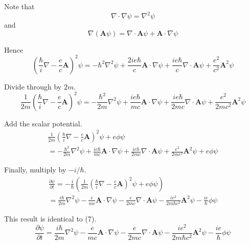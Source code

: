 \documentclass[12pt]{article}
\begin{document}
Note that
\begin{equation*}
\nabla\cdot\nabla\psi=\nabla^2\psi
\end{equation*}
and
\begin{equation*}
\nabla(\mathbf A\psi)=\nabla\cdot\mathbf A\psi+\mathbf A\cdot\nabla\psi
\end{equation*}

Hence
\begin{equation*}
\left(\frac{\hbar}{i}\nabla-\frac{e}{c}\mathbf A\right)^2\psi
=-\hbar^2\nabla^2\psi
+\frac{2ie\hbar}{c}\mathbf A\cdot\nabla\psi
+\frac{ie\hbar}{c}\nabla\cdot\mathbf A\psi
+\frac{e^2}{c^2}\mathbf A^2\psi
\end{equation*}

Divide through by $2m$.
\begin{equation*}
\frac{1}{2m}\left(\frac{\hbar}{i}\nabla-\frac{e}{c}\mathbf A\right)^2\psi
=-\frac{\hbar^2}{2m}\nabla^2\psi
+\frac{ie\hbar}{mc}\mathbf A\cdot\nabla\psi
+\frac{ie\hbar}{2mc}\nabla\cdot\mathbf A\psi
+\frac{e^2}{2mc^2}\mathbf A^2\psi
\end{equation*}

Add the scalar potential.
\begin{multline*}
\frac{1}{2m}\left(\frac{\hbar}{i}\nabla-\frac{e}{c}\mathbf A\right)^2\psi+e\phi\psi
\\
=-\frac{\hbar^2}{2m}\nabla^2\psi
+\frac{ie\hbar}{mc}\mathbf A\cdot\nabla\psi
+\frac{ie\hbar}{2mc}\nabla\cdot\mathbf A\psi
+\frac{e^2}{2mc^2}\mathbf A^2\psi
+e\phi\psi
\end{multline*}

Finally, multiply by $-i/\hbar$.
\begin{multline*}
\frac{\partial\psi}{\partial t}=
-\frac{i}{\hbar}\left(
\frac{1}{2m}\left(\frac{\hbar}{i}\nabla-\frac{e}{c}\mathbf A\right)^2\psi+e\phi\psi
\right)
\\
=\frac{i\hbar}{2m}\nabla^2\psi
-\frac{e}{mc}\mathbf A\cdot\nabla\psi
-\frac{e}{2mc}\nabla\cdot\mathbf A\psi
-\frac{ie^2}{2m\hbar c^2}\mathbf A^2\psi
-\frac{ie}{\hbar}\phi\psi
\end{multline*}

This result is identical to (7).
\begin{equation*}
\frac{\partial\psi}{\partial t}
=\frac{i\hbar}{2m}\nabla^2\psi
-\frac{e}{mc}\mathbf A\cdot\nabla\psi
-\frac{e}{2mc}\nabla\cdot\mathbf A\psi
-\frac{ie^2}{2m\hbar c^2}\mathbf A^2\psi
-\frac{ie}{\hbar}\phi\psi
\tag{7}
\end{equation*}
\end{document}
